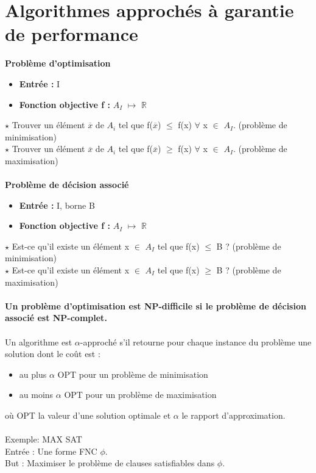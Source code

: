 \documentclass[12pt,a4paper]{article}
\newcommand\tab[1][0.65cm]{\hspace*{#1}}
\begin{document}
\section{Algorithmes approchés à garantie de performance}
\textbf{Problème d'optimisation}
\begin{itemize}
	\item \textbf{Entrée :} I
	\item \textbf{Fonction objective f :} $A_I$ $\longmapsto$ $\mathbb{R}$
\end{itemize}
$\star$ Trouver un élément $\overline{x}$ de $A_i$ tel que f($\overline{x}$) $\leq$ f(x) $\forall$ x $\in$ $A_I$. (problème de minimisation)\\
$\star$ Trouver un élément $\overline{x}$ de $A_i$ tel que f($\overline{x}$) $\geq$ f(x) $\forall$ x $\in$ $A_I$. (problème de maximisation)\\\\
\textbf{Problème de décision associé}
\begin{itemize}
	\item \textbf{Entrée :} I, borne B
	\item \textbf{Fonction objective f :} $A_I$ $\longmapsto$ $\mathbb{R}$
\end{itemize}
$\star$ Est-ce qu'il existe un élément x $\in$ $A_I$ tel que f(x) $\leq$ B ? (problème de minimisation)\\
$\star$ Est-ce qu'il existe un élément x $\in$ $A_I$ tel que f(x) $\geq$ B ? (problème de maximisation)\\\\
\textbf{Un problème d'optimisation est NP-difficile si le problème de décision associé est NP-complet.}\\\\
Un algorithme est $\alpha$-approché s'il retourne pour chaque instance du problème une solution dont le coût est :
\begin{itemize}
	\item au plus $\alpha$ OPT pour un problème de minimisation
	\item au moins $\alpha$ OPT pour un problème de maximisation
\end{itemize}
où OPT la valeur d'une solution optimale et $\alpha$ le rapport d'approximation.\\\\
Exemple: MAX SAT\\
\tab Entrée : Une forme FNC $\phi$.\\
\tab But : Maximiser le problème de clauses satisfiables dans $\phi$.\\
\end{document}
